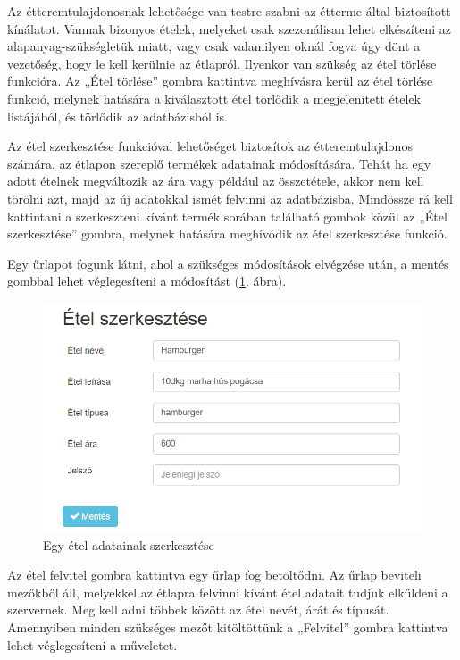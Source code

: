 
Az étteremtulajdonosnak lehetősége van testre szabni az étterme által biztosított kínálatot. Vannak bizonyos ételek, melyeket csak szezonálisan lehet elkészíteni az alap\-anyag-szükségletük miatt, vagy csak valamilyen oknál fogva úgy dönt a vezetőség, hogy le kell kerülnie az étlapról. Ilyenkor van szükség az étel törlése funkcióra. Az „Étel törlése” gombra kattintva meghívásra kerül az étel törlése funkció, melynek hatására a kiválasztott étel törlődik a megjelenített ételek listájából, és törlődik az adatbázisból is.


Az étel szerkesztése funkcióval lehetőséget biztosítok az étteremtulajdonos számára, az étlapon szereplő termékek adatainak módosítására. Tehát ha egy adott ételnek megváltozik az ára vagy például az összetétele, akkor nem kell törölni azt, majd az új adatokkal ismét felvinni az adatbázisba. Mindössze rá kell kattintani a szerkeszteni kívánt termék sorában található gombok közül az „Étel szerkesztése” gombra, melynek hatására meghívódik az étel szerkesztése funkció.

Egy űrlapot fogunk látni, ahol a szükséges módosítások elvégzése után, a mentés gombbal lehet véglegesíteni a módosítást (\ref{fig:edit_meal}. ábra).

\begin{figure}
\centering
\includegraphics[scale=0.8]{kepek/edit_meal.png}
\caption{Egy étel adatainak szerkesztése}
\label{fig:edit_meal}
\end{figure}


Az étel felvitel gombra kattintva egy űrlap fog betöltődni. Az űrlap beviteli mezőkből áll, melyekkel az étlapra felvinni kívánt étel adatait tudjuk elküldeni a szervernek. Meg kell adni többek között az étel nevét, árát és típusát. Amennyiben minden szükséges mezőt kitöltöttünk a „Felvitel” gombra kattintva lehet véglegesíteni a műveletet.

